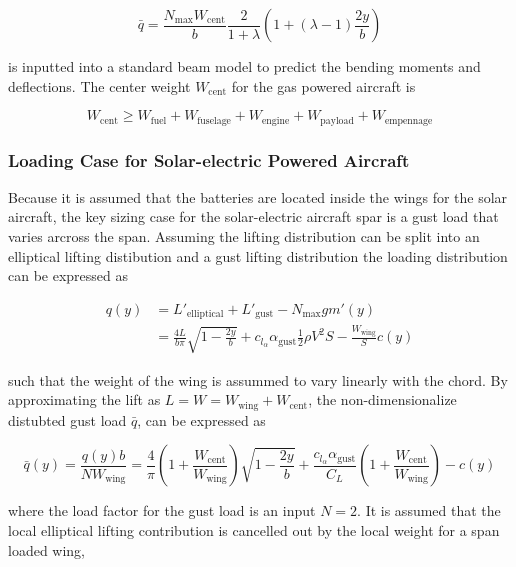 \documentclass[]{aiaa-tc}%
\begin{document}
\begin{equation}
    \label{e:qbar}
    \bar{q} = \frac{N_{\text{max}}W_{\text{cent}}}{b}\frac{2}{1+\lambda} \left( 1 + (\lambda - 1) \frac{2y}{b} \right)
\end{equation}

is inputted into a standard beam model to predict the bending moments and deflections. The center weight $W_{\text{cent}}$ for the gas powered aircraft is

\begin{equation}
    W_{\text{cent}} \geq W_{\text{fuel}} + W_{\text{fuselage}} + W_{\text{engine}} + W_{\text{payload}} + W_{\text{empennage}}
\end{equation}

\subsubsection{Loading Case for Solar-electric Powered Aircraft}

Because it is assumed that the batteries are located inside the wings for the solar aircraft, the key sizing case for the solar-electric aircraft spar is a gust load that varies arcross the span.  Assuming the lifting distribution can be split into an elliptical lifting distibution and a gust lifting distribution the loading distribution can be expressed as

\begin{align}
    \label{e:ellpgustload}
    q(y) &= L'_{\text{elliptical}} + L'_{\text{gust}} - N_{\text{max}}gm'(y) \\
    \label{e:allpgustload2}
    &= \frac{4L}{b\pi} \sqrt{1 - \frac{2y}{b}} + c_{l_{\alpha}} \alpha_{\text{gust}} \frac{1}{2} \rho V^2 S - \frac{W_{\text{wing}}}{S} c(y)
\end{align}

such that the weight of the wing is assummed to vary linearly with the chord. 
By approximating the lift as $L=W=W_{\text{wing}} + W_{\text{cent}}$, the non-dimensionalize distubted gust load $\bar{q}$, can be expressed as

\begin{equation}
    \label{e:ellpgustload3}
    \bar{q}(y) = \frac{q(y)b}{NW_{\text{wing}}} = \frac{4}{\pi}\left( 1 + \frac{W_{\text{cent}}}{W_{\text{wing}}}\right) \sqrt{1-\frac{2y}{b}} + \frac{c_{l_{\alpha}}\alpha_{\text{gust}}}{C_L} \left( 1 + \frac{W_{\text{cent}}}{W_{\text{wing}}}\right) - c(y)
\end{equation}

where the load factor for the gust load is an input $N=2$. It is assumed that the local elliptical lifting contribution is cancelled out by the local weight for a span loaded wing,
\end{document}
